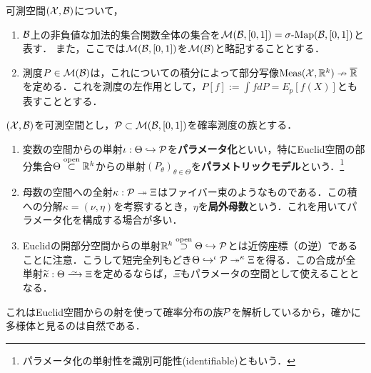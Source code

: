 \documentclass[uplatex,dvipdfmx]{jsreport}
\begin{document}
\begin{notation}
    可測空間$(\X,\B)$について，
    \begin{enumerate}
        \item $\B$上の非負値な加法的集合関数全体の集合を$\M(\B,[0,1])=\sMap(\B,[0,1])$と表す．
        また，ここでは$\M(\B,[0,1])$を$\M(\B)$と略記することとする．
        \item 測度$P\in\M(\B)$は，これについての積分によって部分写像$\Meas(\X,\R^k)\nrightarrow\oR$を定める．これを測度の左作用として，$P[f]:=\int fdP=E_p[f(X)]$とも表すこととする．
    \end{enumerate}
\end{notation}

\begin{definition}
    $(\X,\B)$を可測空間とし，$\P\subset\M(\B,[0,1])$を確率測度の族とする．
    \begin{enumerate}
        \item 変数の空間からの単射$\iota:\Theta\mono\P$を\textbf{パラメータ化}といい，特にEuclid空間の部分集合$\Theta\osub\R^k$からの単射$(P_\theta)_{\theta\in\Theta}$を\textbf{パラメトリックモデル}という．\footnote{パラメータ化の単射性を識別可能性(identifiable)ともいう．}
        \item 母数の空間への全射$\kappa:\P\epi\Xi$はファイバー束のようなものである．この積への分解$\kappa=(\nu,\eta)$を考察するとき，$\eta$を\textbf{局外母数}という．これを用いてパラメータ化を構成する場合が多い．
        \item Euclidの開部分空間からの単射$\R^k\osup\Theta\mono\P$とは近傍座標（の逆）であることに注意．こうして短完全列もどき$\Theta\mono^\iota\P\epi^\kappa\Xi$を得る．この合成が全単射$\wt{\kappa}:\Theta\iso\Xi$を定めるならば，$\Xi$もパラメータの空間として使えることとなる．
    \end{enumerate}
\end{definition}
\begin{remarks}
    これはEuclid空間からの射を使って確率分布の族$\P$を解析しているから，確かに多様体と見るのは自然である．
\end{remarks}
\end{document}
